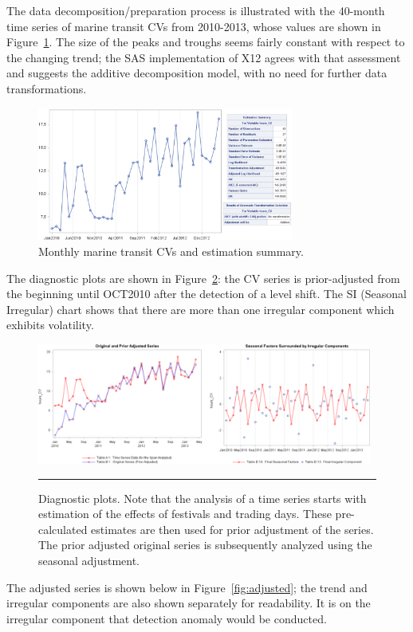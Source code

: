 \begin{Example}
The data decomposition/preparation process is illustrated with the 40-month time series of marine transit CVs from 2010-2013, whose values are shown in Figure~\ref{fig:cv_cont}.  The size of the peaks and troughs seems fairly constant with respect to the changing trend; the SAS implementation of X12 agrees with that assessment and suggests the additive decomposition model, with  no need for further data transformations.
\begin{figure}[t]
\centering
\includegraphics[width=0.75\textwidth]{Images/CV_continuously.png}
\caption{Monthly marine transit CVs and estimation summary.}
\label{fig:cv_cont}
\end{figure}
\par The diagnostic plots are shown in Figure~\ref{fig:diff}: the CV series is prior-adjusted from the beginning until OCT2010 after the detection of a level shift. The SI (Seasonal Irregular) chart shows that there are more than one irregular component which exhibits volatility.
\begin{figure}[t]
\centering
\includegraphics[width=0.98\textwidth]{Images/DiffComponents.png}
\caption[Diagnostic plots.]{Diagnostic plots. Note that the analysis of a time series starts with estimation of the effects of festivals and trading days. These pre-calculated
estimates are then used for prior adjustment of the series. The prior adjusted original series is subsequently analyzed using the seasonal adjustment.}\hrule
\label{fig:diff}
\end{figure}
The adjusted series is shown below in Figure~\ref{fig:adjusted}; the trend and irregular components are also shown separately for readability. It is on the irregular component that detection anomaly would be conducted. 

\end{Example}
